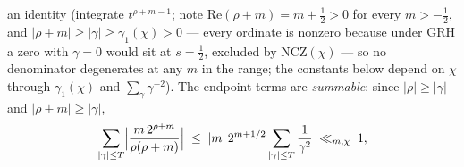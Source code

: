 an identity (integrate $t^{\rho+m-1}$; note
$\mathrm{Re}(\rho+m)=m+\tfrac12>0$ for every $m>-\tfrac12$, and
$|\rho+m|\ge|\gamma|\ge\gamma_1(\chi)>0$ --- every ordinate is nonzero
because under GRH a zero with $\gamma=0$ would sit at $s=\tfrac12$,
excluded by NCZ$(\chi)$ --- so no denominator degenerates at any
$m$ in the range; the constants below depend on $\chi$ through
$\gamma_1(\chi)$ and $\sum_\gamma\gamma^{-2}$). The endpoint terms are
\emph{summable}: since
$|\rho|\ge|\gamma|$ and $|\rho+m|\ge|\gamma|$,
\[
\sum_{|\gamma|\le T}\Bigl|\frac{m\,2^{\rho+m}}{\rho(\rho+m)}\Bigr|
\;\le\;|m|\,2^{m+1/2}\sum_{|\gamma|\le T}\frac{1}{\gamma^{2}}
\;\ll_{m,\chi}\;1,
\]

